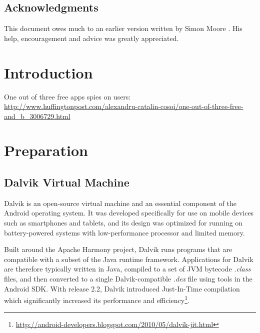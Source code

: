 \documentclass[12pt,twoside,notitlepage]{report}
\begin{document}
\newpage
\section*{Acknowledgments}

This document owes much to an earlier version written by Simon Moore
\cite{moore95}.  His help, encouragement and advice was greatly 
appreciated.


\cleardoublepage        %

\setcounter{page}{1}
\pagestyle{headings}

\chapter{Introduction}

One out of three free apps spies on users: \url{http://www.huffingtonpost.com/alexandru-catalin-cosoi/one-out-of-three-free-and_b_3006729.html}

\cleardoublepage
\chapter{Preparation}

\section{Dalvik Virtual Machine}

Dalvik is an open-source virtual machine and an essential component of the Android operating system. It was developed specifically for use on mobile devices such as smartphones and tablets, and its design was optimized for running on battery-powered systems with low-performance processor and limited memory. 

Built around the Apache Harmony project, Dalvik runs programs that are compatible with a subset of the Java runtime framework. Applications for Dalvik are therefore typically written in Java, compiled to a set of JVM bytecode \emph{.class} files, and then converted to a single Dalvik-compatible \emph{.dex} file using tools in the Android SDK. With release 2.2, Dalvik introduced Just-In-Time compilation which significantly increased its performance and efficiency\footnote{\url{http://android-developers.blogspot.com/2010/05/dalvik-jit.html}}.
\end{document}
